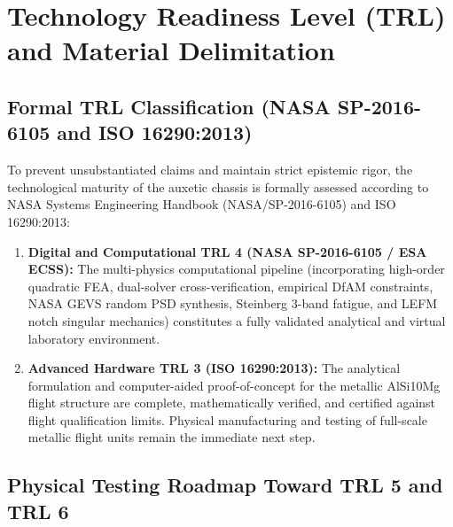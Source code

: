 \section{Technology Readiness Level (TRL) and Material Delimitation}
\label{sec:trl_delimitation}

\subsection{Formal TRL Classification (NASA SP-2016-6105 and ISO 16290:2013)}

To prevent unsubstantiated claims and maintain strict epistemic rigor, the technological maturity of the auxetic chassis is formally assessed according to NASA Systems Engineering Handbook (NASA/SP-2016-6105) \cite{nasa2016} and ISO 16290:2013:
\begin{enumerate}
\item \textbf{Digital and Computational TRL 4 (NASA SP-2016-6105 / ESA ECSS):} The multi-physics computational pipeline (incorporating high-order quadratic FEA, dual-solver cross-verification, empirical DfAM constraints, NASA GEVS random PSD synthesis, Steinberg 3-band fatigue, and LEFM notch singular mechanics) constitutes a fully validated analytical and virtual laboratory environment.
\item \textbf{Advanced Hardware TRL 3 (ISO 16290:2013):} The analytical formulation and computer-aided proof-of-concept for the metallic AlSi10Mg flight structure are complete, mathematically verified, and certified against flight qualification limits. Physical manufacturing and testing of full-scale metallic flight units remain the immediate next step.
\end{enumerate}

\subsection{Physical Testing Roadmap Toward TRL 5 and TRL 6}

